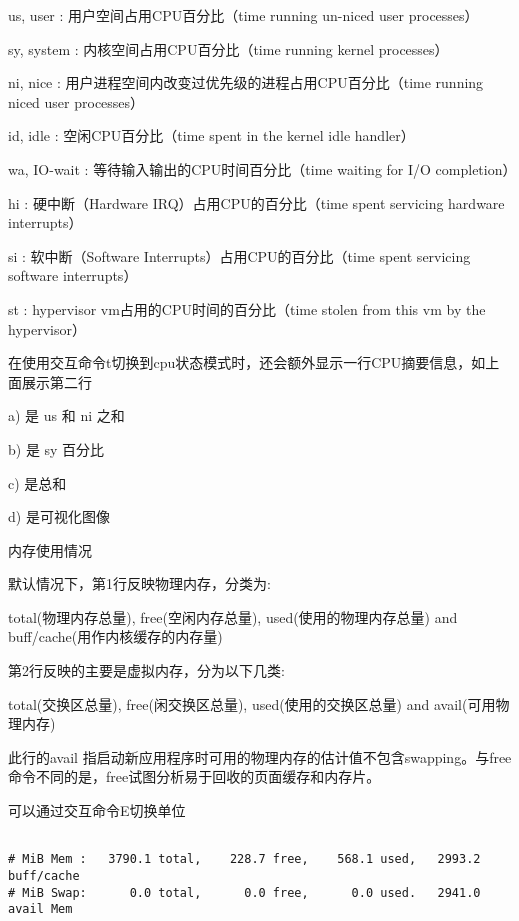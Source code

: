 us, user    : 用户空间占用CPU百分比（time running un-niced user processes）    \par
sy, system  : 内核空间占用CPU百分比（time running kernel processes）  \par
ni, nice    : 用户进程空间内改变过优先级的进程占用CPU百分比（time running niced user processes）   \par
id, idle    : 空闲CPU百分比（time spent in the kernel idle handler）  \par
wa, IO-wait : 等待输入输出的CPU时间百分比（time waiting for I/O completion）       \par
hi : 硬中断（Hardware IRQ）占用CPU的百分比（time spent servicing hardware interrupts）      \par
si : 软中断（Software Interrupts）占用CPU的百分比（time spent servicing software interrupts）      \par
st : hypervisor vm占用的CPU时间的百分比（time stolen from this vm by the hypervisor） \par

在使用交互命令t切换到cpu状态模式时，还会额外显示一行CPU摘要信息，如上面展示第二行

a) 是 us 和 ni 之和 \par
b) 是 sy 百分比 \par
c) 是总和   \par
d) 是可视化图像 \par


内存使用情况

默认情况下，第1行反映物理内存，分类为:\par
total(物理内存总量), free(空闲内存总量), used(使用的物理内存总量) and buff/cache(用作内核缓存的内存量)

第2行反映的主要是虚拟内存，分为以下几类:\par
total(交换区总量), free(闲交换区总量), used(使用的交换区总量) and avail(可用物理内存)

此行的avail 指启动新应用程序时可用的物理内存的估计值不包含swapping。与free命令不同的是，free试图分析易于回收的页面缓存和内存片。

可以通过交互命令E切换单位

\begin{lstlisting}[language=cshell]

# MiB Mem :   3790.1 total,    228.7 free,    568.1 used,   2993.2 buff/cache
# MiB Swap:      0.0 total,      0.0 free,      0.0 used.   2941.0 avail Mem

\end{lstlisting}

